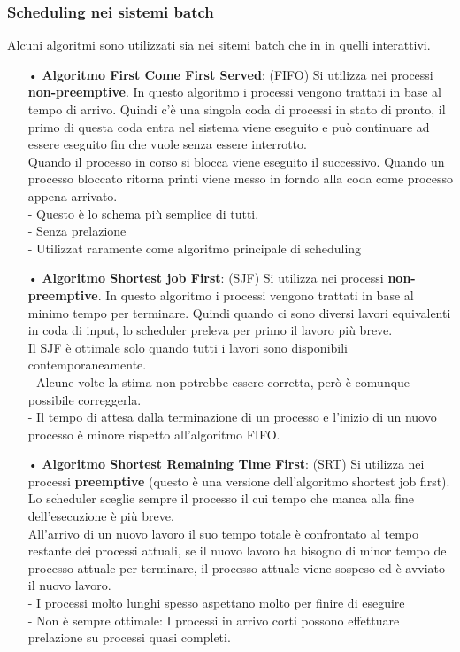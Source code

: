 \documentclass{article}
\begin{document}
\subsubsection{Scheduling nei sistemi batch}
Alcuni algoritmi sono utilizzati sia nei sitemi batch che in in quelli interattivi.
\\
\begin{enumerate}
   \item[•] \textbf{Algoritmo First Come First Served}: (FIFO) Si utilizza nei processi \textbf{non-preemptive}. In questo algoritmo i processi vengono trattati in base al tempo di arrivo.
      Quindi c'è una singola coda di processi in stato di pronto, il primo di questa coda entra nel sistema viene eseguito e può continuare ad essere eseguito fin che vuole senza essere interrotto.
      \\Quando il processo in corso si blocca viene eseguito il successivo. Quando un processo bloccato ritorna printi viene messo in forndo alla coda come processo appena arrivato.\\
      - Questo è lo schema più semplice di tutti.
      \\- Senza prelazione
      \\- Utilizzat raramente come algoritmo principale di scheduling
   \item[•] \textbf{Algoritmo Shortest job First}: (SJF) Si utilizza nei processi \textbf{non-preemptive}. In questo algoritmo i processi vengono trattati in base al minimo tempo per terminare.
      Quindi quando ci sono diversi lavori equivalenti in coda di input, lo scheduler preleva per primo il lavoro più breve.\\
      Il SJF è ottimale solo quando tutti i lavori sono disponibili contemporaneamente.
      \\- Alcune volte la stima non potrebbe essere corretta, però è comunque possibile correggerla.
      \\- Il tempo di attesa dalla terminazione di un processo e l'inizio di un nuovo processo è minore rispetto all'algoritmo FIFO.
   \item[•] \textbf{Algoritmo Shortest Remaining Time First}: (SRT) Si utilizza nei processi \textbf{preemptive} (questo è una versione dell'algoritmo shortest job first). Lo scheduler sceglie sempre il processo il cui 
      tempo che manca alla fine dell'esecuzione è più breve.
      \\All'arrivo di un nuovo lavoro il suo tempo totale è confrontato al tempo restante dei processi attuali, se il nuovo lavoro ha bisogno di minor tempo del processo attuale per terminare, il processo attuale viene sospeso ed è avviato il nuovo lavoro.
      \\- I processi molto lunghi spesso aspettano molto per finire di eseguire 
      \\- Non è sempre ottimale: I processi in arrivo corti possono effettuare prelazione su processi quasi completi. 
\end{enumerate}
\end{document}
